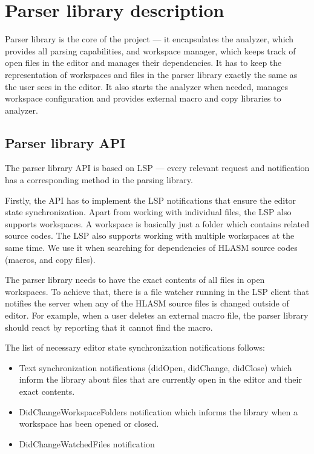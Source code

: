 \section{Parser library description}

Parser library is the core of the project --- it encapsulates the analyzer, which provides all parsing capabilities, and workspace manager, which keeps track of open files in the editor and manages their dependencies. It has to keep the representation of workspaces and files in the parser library exactly the same as the user sees in the editor. It also starts the analyzer when needed, manages workspace configuration and provides external macro and copy libraries to analyzer.

\subsection{Parser library API}
The parser library API is based on LSP --- every relevant request and notification has a corresponding method in the parsing library.

Firstly, the API has to implement the LSP notifications that ensure the editor state synchronization. Apart from working with individual files, the LSP also supports workspaces. A workspace is basically just a folder which contains related source codes. The LSP also supports working with multiple workspaces at the same time. We use it when searching for dependencies of HLASM source codes (macros, and copy files).

The parser library needs to have the exact contents of all files in open workspaces. To achieve that, there is a file watcher running in the LSP client that notifies the server when any of the HLASM source files is changed outside of editor. For example, when a user deletes an external macro file, the parser library should react by reporting that it cannot find the macro.

The list of necessary editor state synchronization notifications follows:
\begin{itemize}
	\item Text synchronization notifications (didOpen, didChange, didClose) which inform the library about files that are currently open in the editor and their exact contents.
	\item DidChangeWorkspaceFolders notification which informs the library when a workspace has been opened or closed.
	\item DidChangeWatchedFiles notification
\end{itemize}



